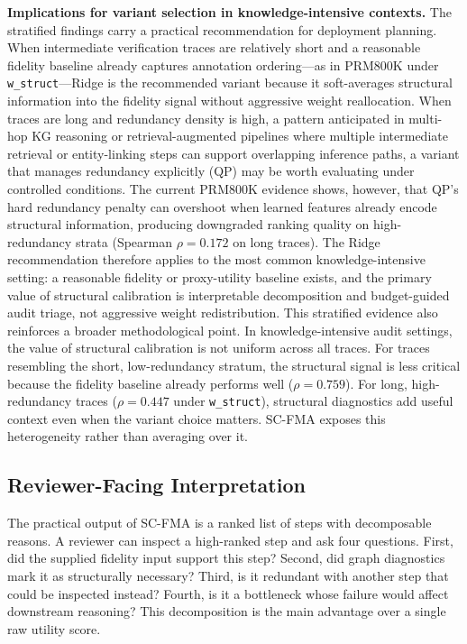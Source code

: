 \documentclass[a4paper,fleqn]{cas-sc}
\begin{document}
\medskip
\noindent\textbf{Implications for variant selection in knowledge-intensive contexts.} The stratified findings carry a practical recommendation for deployment planning. When intermediate verification traces are relatively short and a reasonable fidelity baseline already captures annotation ordering---as in PRM800K under \texttt{w\_struct}---Ridge is the recommended variant because it soft-averages structural information into the fidelity signal without aggressive weight reallocation. When traces are long and redundancy density is high, a pattern anticipated in multi-hop KG reasoning or retrieval-augmented pipelines where multiple intermediate retrieval or entity-linking steps can support overlapping inference paths, a variant that manages redundancy explicitly (QP) may be worth evaluating under controlled conditions. The current PRM800K evidence shows, however, that QP's hard redundancy penalty can overshoot when learned features already encode structural information, producing downgraded ranking quality on high-redundancy strata (Spearman $\rho=0.172$ on long traces). The Ridge recommendation therefore applies to the most common knowledge-intensive setting: a reasonable fidelity or proxy-utility baseline exists, and the primary value of structural calibration is interpretable decomposition and budget-guided audit triage, not aggressive weight redistribution. This stratified evidence also reinforces a broader methodological point. In knowledge-intensive audit settings, the value of structural calibration is not uniform across all traces. For traces resembling the short, low-redundancy stratum, the structural signal is less critical because the fidelity baseline already performs well ($\rho=0.759$). For long, high-redundancy traces ($\rho=0.447$ under \texttt{w\_struct}), structural diagnostics add useful context even when the variant choice matters. SC-FMA exposes this heterogeneity rather than averaging over it.

\subsection{Reviewer-Facing Interpretation}

The practical output of SC-FMA is a ranked list of steps with decomposable reasons. A reviewer can inspect a high-ranked step and ask four questions. First, did the supplied fidelity input support this step? Second, did graph diagnostics mark it as structurally necessary? Third, is it redundant with another step that could be inspected instead? Fourth, is it a bottleneck whose failure would affect downstream reasoning? This decomposition is the main advantage over a single raw utility score.
\end{document}
